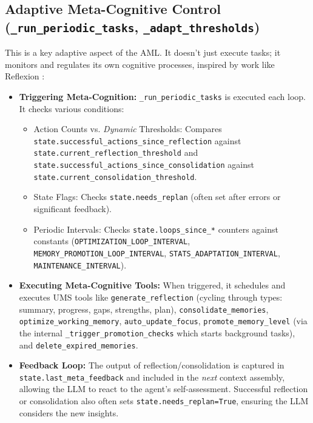 \documentclass[12pt,a4paper]{article}
\newcommand{\code}[1]{\nolinkurl{#1}}
\begin{document}
\subsection{Adaptive Meta-Cognitive Control (\code{\_run\_periodic\_tasks}, \code{\_adapt\_thresholds})}

This is a key adaptive aspect of the AML. It doesn't just execute tasks; it monitors and regulates its own cognitive processes, inspired by work like Reflexion \cite{Ref17}:

\begin{itemize}
    \item \textbf{Triggering Meta-Cognition:} \code{\_run\_periodic\_tasks} is executed each loop. It checks various conditions:
    \begin{itemize}
        \item Action Counts vs. \textit{Dynamic} Thresholds: Compares \code{state.successful\_actions\_since\_reflection} against \code{state.current\_reflection\_threshold} and \code{state.successful\_actions\_since\_consolidation} against \code{state.current\_consolidation\_threshold}.
        \item State Flags: Checks \code{state.needs\_replan} (often set after errors or significant feedback).
        \item Periodic Intervals: Checks \code{state.loops\_since\_*} counters against constants (\code{OPTIMIZATION\_LOOP\_INTERVAL}, \code{MEMORY\_PROMOTION\_LOOP\_INTERVAL}, \code{STATS\_ADAPTATION\_INTERVAL}, \code{MAINTENANCE\_INTERVAL}).
    \end{itemize}

    \item \textbf{Executing Meta-Cognitive Tools:} When triggered, it schedules and executes UMS tools like \code{generate\_reflection} (cycling through types: summary, progress, gaps, strengths, plan), \code{consolidate\_memories}, \code{optimize\_working\_memory}, \code{auto\_update\_focus}, \code{promote\_memory\_level} (via the internal \code{\_trigger\_promotion\_checks} which starts background tasks), and \code{delete\_expired\_memories}.

    \item \textbf{Feedback Loop:} The output of reflection/consolidation is captured in \code{state.last\_meta\_feedback} and included in the \textit{next} context assembly, allowing the LLM to react to the agent's self-assessment. Successful reflection or consolidation also often sets \code{state.needs\_replan=True}, ensuring the LLM considers the new insights.


\end{itemize}
\end{document}
